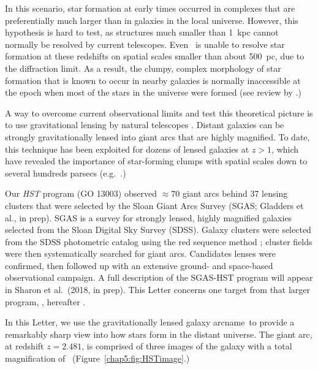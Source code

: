In this scenario, star formation at early times occurred in complexes that are preferentially much larger 
than in galaxies in the local universe.  
However, this hypothesis is hard to test, as structures much smaller than 1~kpc cannot 
normally be resolved by current telescopes.  
Even \hst\ is unable to  resolve star formation  at these redshifts on spatial 
scales smaller than about 500~pc, due to the diffraction limit.  
As a result,  the clumpy, 
complex morphology of star formation that is known to occur 
in nearby galaxies is normally inaccessible at the epoch when 
most of the stars in the universe were formed (see review by \citealt{Madau:2014qd}.) 

A way to overcome current observational limits and test this theoretical picture is to use
gravitational lensing by natural telescopes \citep{Einstein:1936cl, Zwicky:1937yq}.
Distant galaxies can be strongly gravitationally lensed into giant arcs that are highly magnified.  
To date, this technique has been exploited for dozens of lensed galaxies at 
$z>1$, which have revealed the importance of star-forming clumps with spatial 
scales down to several hundreds parsecs (e.g.~\citealt{Livermore:2012fk, Jones:2010uq}.)

Our \textit{HST} program (GO 13003) observed 
$\approx 70$ giant arcs behind 
37 lensing clusters that were selected by the 
Sloan Giant Arcs Survey (SGAS; Gladders et al., in prep).  
SGAS is a survey for strongly lensed, highly magnified galaxies selected from 
the Sloan Digital Sky Survey (SDSS).  
Galaxy clusters were selected from the SDSS photometric catalog using the 
red sequence method \citep{Gladders:2000kq}; cluster fields were 
then systematically searched for giant arcs.
Candidates lenses were confirmed, then followed up with an extensive
ground- and space-based observational campaign.
A full description of the SGAS-HST program will appear in Sharon et al.\ (2018, in prep). 
This Letter concerns one target from that larger program, \giantarc, hereafter \arcname.

In this Letter, we use the gravitationally lensed galaxy 
arcname\ to provide a 
remarkably sharp view into how stars form in the distant universe.
The giant arc, at redshift $z=2.481$, is comprised of three images of the galaxy with a 
total magnification of \totalmagnification\  (Figure~\ref{chap5:fig:HSTimage}.) 

